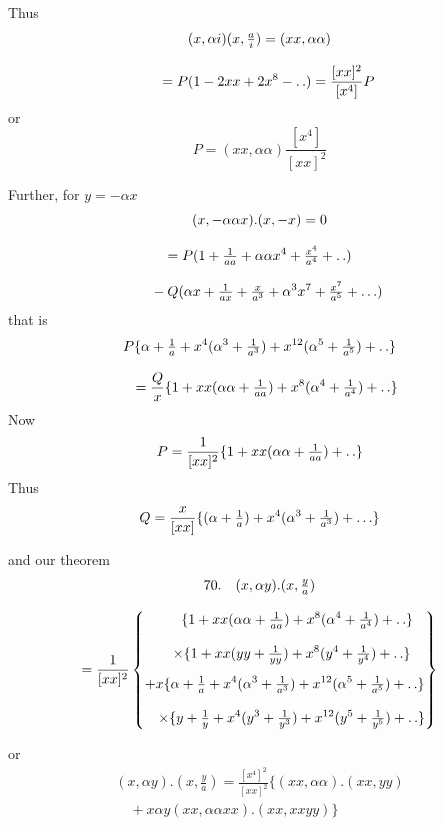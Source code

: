Thus
\[
\begin{gathered}(x,\alpha i)(x,\tfrac ai)=(xx,\alpha\alpha)
 \\[8pt]\quad{}=P(1-2xx+2x^8-\mathinner{.\,.})=\frac{[xx]^2}{[x^4]}P\end{gathered}
\]
or
\[
P=(xx,\alpha\alpha)\frac{[x^4]}{[xx]^2}
\]

Further, for $y=-\alpha x$
\[
\begin{gathered}
(x,-\alpha\alpha x).(x,-x)=0\\[8pt]
=P(1+\tfrac1{aa}+\alpha\alpha x^4+\tfrac{x^4}{a^4}+\mathinner{.\,.})
 \\[8pt]\quad{}-Q(\alpha x+\tfrac1{ax}+\tfrac x{a^3}+\alpha^3x^7+\tfrac{x^7}{a^5}+\mathinner{.\,.\,.})
\end{gathered}
\]
that is
\[
\begin{gathered}
P\{\alpha+\tfrac1a+x^4(\alpha^3+\tfrac1{a^3})+x^{12}(\alpha^5+\tfrac1{a^5})+\mathinner{.\,.}\}\\[8pt]
\quad=\frac Qx\{1+xx(\alpha\alpha+\tfrac1{aa})+x^8(\alpha^4+\tfrac1{a^4})+\mathinner{.\,.}\}
\end{gathered}
\]
Now
\[
P=\frac1{[xx]^2}\{1+xx(\alpha\alpha+\tfrac1{aa})+\mathinner{.\,.}\}
\]
Thus
\[
Q=\frac x{[xx]}\{(\alpha+\tfrac1a)+x^4(\alpha^3+\tfrac1{a^3})+\mathinner{.\,.\,.}\}
\]

and our theorem
\[
\begin{gathered}
70.\quad{}
(x,\alpha y).(x,\tfrac ya)\\[8pt]
=\frac1{[xx]^2}\left\{\begin{gathered}
\phantom{{}+x}\{1+xx(\alpha\alpha+\tfrac1{aa})+x^8(\alpha^4+\tfrac1{a^4})+\mathinner{.\,.}\}\\[8pt]
\quad\times\{1+xx(yy+\tfrac1{yy})+x^8(y^4+\tfrac1{y^4})+\mathinner{.\,.}\}\\[1ex]
+x\{\alpha+\tfrac1a+x^4(\alpha^3+\tfrac1{a^3})+x^{12}(\alpha^5+\tfrac1{a^5})+\mathinner{.\,.}\}\\[8pt]
\quad\times\{y+\tfrac1y+x^4(y^3+\tfrac1{y^3})+x^{12}(y^5+\tfrac1{y^5})+\mathinner{.\,.}\}
\end{gathered}\right\}
\end{gathered}
\]



or
\[
\begin{gathered}(x,\alpha y).(x,\tfrac ya)
 =\frac{[x^4]^2}{[xx]^2}\{(xx,\alpha\alpha).(xx,yy)
 \\[8pt]\quad{}+x\alpha y(xx,\alpha\alpha xx).(xx,xxyy)\}\end{gathered}
\]

